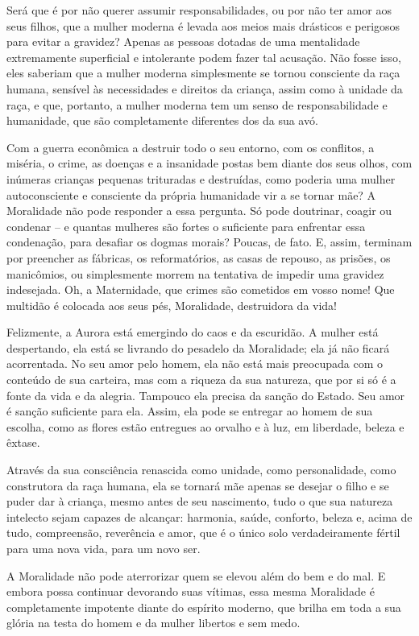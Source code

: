 Será que é por não querer assumir responsabilidades, ou por não ter amor
aos seus filhos, que a mulher moderna é levada aos meios mais drásticos
e perigosos para evitar a gravidez? Apenas as pessoas dotadas de uma
mentalidade extremamente superficial e intolerante podem fazer tal
acusação. Não fosse isso, eles saberiam que a mulher moderna
simplesmente se tornou consciente da raça humana, sensível às
necessidades e direitos da criança, assim como à unidade da raça, e que,
portanto, a mulher moderna tem um senso de responsabilidade e
humanidade, que são completamente diferentes dos da sua avó.

Com a guerra econômica a destruir todo o seu entorno, com os conflitos,
a miséria, o crime, as doenças e a insanidade postas bem diante dos seus
olhos, com inúmeras crianças pequenas trituradas e destruídas, como
poderia uma mulher autoconsciente e consciente da própria humanidade vir
a se tornar mãe? A Moralidade não pode responder a essa pergunta. Só
pode doutrinar, coagir ou condenar -- e quantas mulheres são fortes o
suficiente para enfrentar essa condenação, para desafiar os dogmas
morais? Poucas, de fato. E, assim, terminam por preencher as fábricas,
os reformatórios, as casas de repouso, as prisões, os manicômios, ou
simplesmente morrem na tentativa de impedir uma gravidez indesejada. Oh,
a Maternidade, que crimes são cometidos em vosso nome! Que multidão é
colocada aos seus pés, Moralidade, destruidora da vida!

Felizmente, a Aurora está emergindo do caos e da escuridão. A mulher
está despertando, ela está se livrando do pesadelo da Moralidade; ela já
não ficará acorrentada. No seu amor pelo homem, ela não está mais
preocupada com o conteúdo de sua carteira, mas com a riqueza da sua
natureza, que por si só é a fonte da vida e da alegria. Tampouco ela
precisa da sanção do Estado. Seu amor é sanção suficiente para ela.
Assim, ela pode se entregar ao homem de sua escolha, como as flores
estão entregues ao orvalho e à luz, em liberdade, beleza e êxtase.

Através da sua consciência renascida como unidade, como personalidade,
como construtora da raça humana, ela se tornará mãe apenas se desejar o
filho e se puder dar à criança, mesmo antes de seu nascimento, tudo o
que sua natureza intelecto sejam capazes de alcançar: harmonia, saúde,
conforto, beleza e, acima de tudo, compreensão, reverência e amor, que é
o único solo verdadeiramente fértil para uma nova vida, para um novo
ser.

A Moralidade não pode aterrorizar quem se elevou além do bem e do mal. E
embora possa continuar devorando suas vítimas, essa mesma Moralidade é
completamente impotente diante do espírito moderno, que brilha em toda a
sua glória na testa do homem e da mulher libertos e sem medo.

